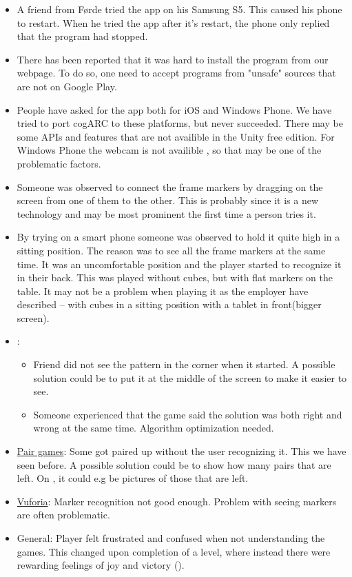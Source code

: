 \begin{itemize}
	\item A friend from F\o{}rde tried the app on his Samsung S5. This caused his phone to restart. When he tried the app after it's restart, the phone only replied that the program had stopped.
	\item There has been reported that it was hard to install the program from
	our webpage. To do so, one need to accept programs from "unsafe" sources
	that are not on Google Play.
	\item People have asked for the app both for iOS and Windows Phone. We have
	tried to port cogARC to these platforms, but never succeeded. There may be
	some APIs and features that are not availible in the Unity free edition.
	For Windows Phone the webcam is not availible
	\cite{GettingStartedWindowsPhoneBuildUnity}, so that may be one of the
	problematic factors.
	\item Someone was observed to connect the frame markers by dragging
	on the screen from one of them to the other. This is probably since it is a
	new technology and may be most prominent the first time a person tries it.
	\item By trying on a smart phone someone was observed to hold it quite high
	in a sitting position. The reason was to see all the frame markers at the 
	same time. It was an uncomfortable position and the player started to 
	recognize it in their back. This was played without cubes, but with flat
	markers on the table. It may not be a problem when playing it as the
	employer have described -- with cubes in a sitting position with a tablet
	in front(bigger screen).
	\vspace{8pt}
	\item {}:
		\vspace{-8pt}
		\begin{itemize}
			\item Friend did not see the pattern in the corner when it
			started. A possible solution could be to put it at the middle of
			the screen to make it easier to see.
			\item Someone experienced that the game said the solution was both
			right and wrong at the same time. Algorithm optimization needed.
		\end{itemize}
	\item \hyperref[fig:pair_games]{Pair games}: Some got paired up without the user recognizing it. This
	we have seen before. A possible solution could be to show how many
	pairs that are left. On , it could e.g be 
	pictures of those that are left.
	\item \hyperref[subsec:vuforia]{Vuforia}: Marker recognition not good
	enough. Problem with seeing	markers are often problematic.
	\item General: Player felt frustrated and confused when not understanding
	the games. This changed upon completion of a level, where instead there 
	were rewarding feelings of joy and victory ().
\end{itemize}